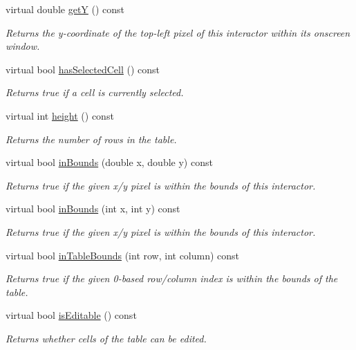 \begin{DoxyCompactItemize}
virtual double \mbox{\hyperlink{classsgl_1_1GInteractor_aafa51c7f8f38a09febbb9ce7853f77b4}{getY}} () const
\begin{DoxyCompactList}\small\item\em Returns the y-\/coordinate of the top-\/left pixel of this interactor within its onscreen window. \end{DoxyCompactList}\item 
virtual bool \mbox{\hyperlink{classsgl_1_1GTable_a4a1007a3d14cd35f0bd514cc0b29886b}{has\+Selected\+Cell}} () const
\begin{DoxyCompactList}\small\item\em Returns true if a cell is currently selected. \end{DoxyCompactList}\item 
virtual int \mbox{\hyperlink{classsgl_1_1GTable_ad3774f6419003470f54fd495124ef51f}{height}} () const
\begin{DoxyCompactList}\small\item\em Returns the number of rows in the table. \end{DoxyCompactList}\item 
virtual bool \mbox{\hyperlink{classsgl_1_1GInteractor_afc480f652b8c5f1fb255e2269ce68879}{in\+Bounds}} (double x, double y) const
\begin{DoxyCompactList}\small\item\em Returns true if the given x/y pixel is within the bounds of this interactor. \end{DoxyCompactList}\item 
virtual bool \mbox{\hyperlink{classsgl_1_1GInteractor_ae6d7982c1c627b677a5e776ca86118ed}{in\+Bounds}} (int x, int y) const
\begin{DoxyCompactList}\small\item\em Returns true if the given x/y pixel is within the bounds of this interactor. \end{DoxyCompactList}\item 
virtual bool \mbox{\hyperlink{classsgl_1_1GTable_adcc2e619680a96a5b266d18a9ff2cdf4}{in\+Table\+Bounds}} (int row, int column) const
\begin{DoxyCompactList}\small\item\em Returns true if the given 0-\/based row/column index is within the bounds of the table. \end{DoxyCompactList}\item 
virtual bool \mbox{\hyperlink{classsgl_1_1GTable_a012b5afb54e037e6c5498cf0932a521b}{is\+Editable}} () const
\begin{DoxyCompactList}\small\item\em Returns whether cells of the table can be edited. \end{DoxyCompactList}\item 

\end{DoxyCompactItemize}

